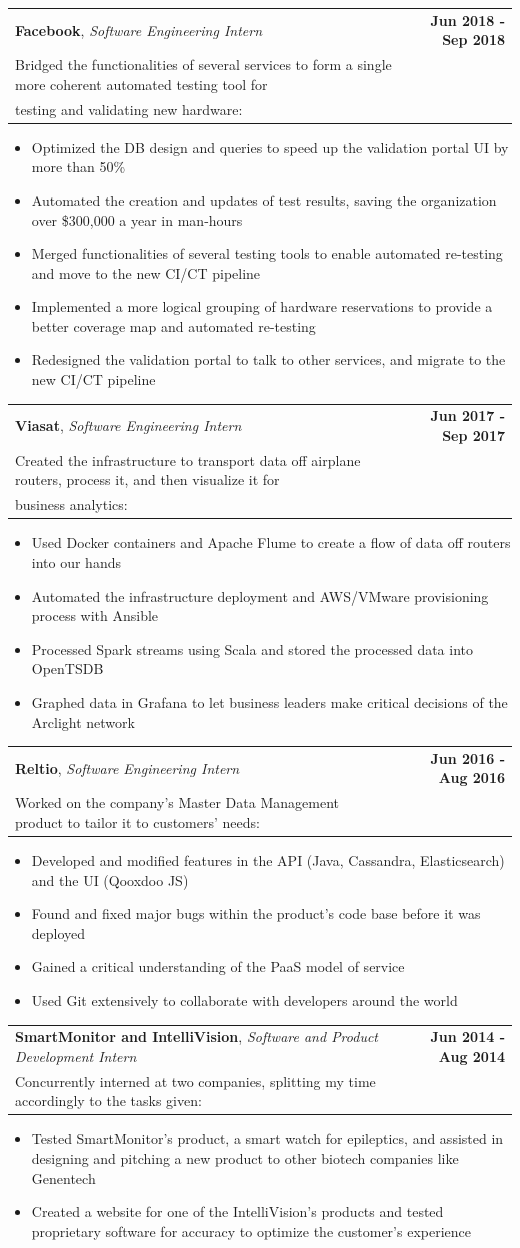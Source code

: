 \documentclass[letterpaper,10.8pt]{article}
\makeatletter
\newcommand{\resumeItemOne}[1]{
  \item[$\circ$]\small{{#1 \vspace{-2pt}}
  }
}
\newcommand{\resumeSubheading}[4]{
  \vspace{-2pt}\item[$ $]
    \begin{tabular*}{0.97\textwidth}{l@{\extracolsep{\fill}}r}
      \textbf{#1}, \textit{\small #2} & \textbf{\small #3} \\
      \small #4
    \end{tabular*}
  \vspace{-7pt}
}
\newcommand{\resumeItemListStart}{\begin{itemize}}
\newcommand{\resumeItemListEnd}{\end{itemize}\vspace{-5pt}}
\makeatother
\begin{document}
    \resumeSubheading
    {Facebook}{Software Engineering Intern}{Jun 2018 - Sep 2018}{Bridged the functionalities of several services to form a single more coherent automated testing tool for\\ testing and validating new hardware: }
    \resumeItemListStart
        \resumeItemOne{Optimized the DB design and queries to speed up the validation portal UI by more than 50\%}
        \resumeItemOne{Automated the creation and updates of test results, saving the organization over \$300,000 a year in man-hours}
        \resumeItemOne{Merged functionalities of several testing tools to enable automated re-testing and move to the new CI/CT pipeline}
        \resumeItemOne{Implemented a more logical grouping of hardware reservations to provide a better coverage map and
        automated re-testing}
        \resumeItemOne{Redesigned the validation portal to talk to other services, and migrate to the new CI/CT pipeline}
    \resumeItemListEnd
  
    \resumeSubheading
    {Viasat}{Software Engineering Intern}{Jun 2017 - Sep 2017}{Created the infrastructure to transport data off airplane routers, process it, and then visualize it for \\ business analytics:}
    \resumeItemListStart
        \resumeItemOne{Used Docker containers and Apache Flume to create a flow of data off routers into our hands}
        \resumeItemOne{Automated the infrastructure deployment and AWS/VMware provisioning process with Ansible}
        \resumeItemOne{Processed Spark streams using Scala and stored the processed data into OpenTSDB}
        \resumeItemOne{Graphed data in Grafana to let business leaders make critical decisions of the Arclight network}
    \resumeItemListEnd
    
    \resumeSubheading
    {Reltio}{Software Engineering Intern}{Jun 2016 - Aug 2016}{Worked on the company's Master Data Management product to tailor it to customers' needs:}
    \resumeItemListStart
        \resumeItemOne{Developed and modified features in the API (Java, Cassandra, Elasticsearch) and the UI (Qooxdoo JS)}
        \resumeItemOne{Found and fixed major bugs within the product's code base before it was deployed}
        \resumeItemOne{Gained a critical understanding of the PaaS model of service}
        \resumeItemOne{Used Git extensively to collaborate with developers around the world}
    \resumeItemListEnd
    
    \resumeSubheading
    {SmartMonitor and IntelliVision}{Software and Product Development Intern}{Jun 2014 - Aug 2014}{Concurrently interned at two companies, splitting my time accordingly to the tasks given:}
    \resumeItemListStart
        \resumeItemOne{Tested SmartMonitor's product, a smart watch for epileptics, and assisted in designing and pitching a
        new product to other biotech companies like Genentech}
        \resumeItemOne{Created a website for one of the IntelliVision's products and tested proprietary software for accuracy
        to optimize the customer's experience}
    \resumeItemListEnd
\end{document}
